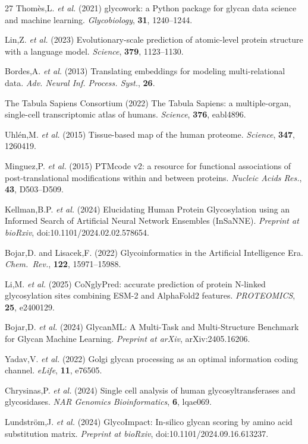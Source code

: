 \documentclass[11pt,a4paper]{ltjsarticle}
\begin{document}
\begin{thebibliography}{27}
Thom\`es,L. \textit{et al.} (2021) glycowork: a Python package for glycan data science and machine learning. \textit{Glycobiology}, \textbf{31}, 1240--1244.

Lin,Z. \textit{et al.} (2023) Evolutionary-scale prediction of atomic-level protein structure with a language model. \textit{Science}, \textbf{379}, 1123--1130.

Bordes,A. \textit{et al.} (2013) Translating embeddings for modeling multi-relational data. \textit{Adv. Neural Inf. Process. Syst.}, \textbf{26}.

The Tabula Sapiens Consortium (2022) The Tabula Sapiens: a multiple-organ, single-cell transcriptomic atlas of humans. \textit{Science}, \textbf{376}, eabl4896.

Uhl\'en,M. \textit{et al.} (2015) Tissue-based map of the human proteome. \textit{Science}, \textbf{347}, 1260419.

Minguez,P. \textit{et al.} (2015) PTMcode v2: a resource for functional associations of post-translational modifications within and between proteins. \textit{Nucleic Acids Res.}, \textbf{43}, D503--D509.

Kellman,B.P. \textit{et al.} (2024) Elucidating Human Protein Glycosylation using an Informed Search of Artificial Neural Network Ensembles (InSaNNE). \textit{Preprint at bioRxiv}, doi:10.1101/2024.02.02.578654.

Bojar,D. and Lisacek,F. (2022) Glycoinformatics in the Artificial Intelligence Era. \textit{Chem.\ Rev.}, \textbf{122}, 15971--15988.

Li,M. \textit{et al.} (2025) CoNglyPred: accurate prediction of protein N-linked glycosylation sites combining ESM-2 and AlphaFold2 features. \textit{PROTEOMICS}, \textbf{25}, e2400129.

Bojar,D. \textit{et al.} (2024) GlycanML: A Multi-Task and Multi-Structure Benchmark for Glycan Machine Learning. \textit{Preprint at arXiv}, arXiv:2405.16206.

Yadav,V. \textit{et al.} (2022) Golgi glycan processing as an optimal information coding channel. \textit{eLife}, \textbf{11}, e76505.

Chrysinas,P. \textit{et al.} (2024) Single cell analysis of human glycosyltransferases and glycosidases. \textit{NAR Genomics Bioinformatics}, \textbf{6}, lqae069.

Lundstr\"om,J. \textit{et al.} (2024) GlycoImpact: In-silico glycan scoring by amino acid substitution matrix. \textit{Preprint at bioRxiv}, doi:10.1101/2024.09.16.613237.

\end{thebibliography}
\end{document}
